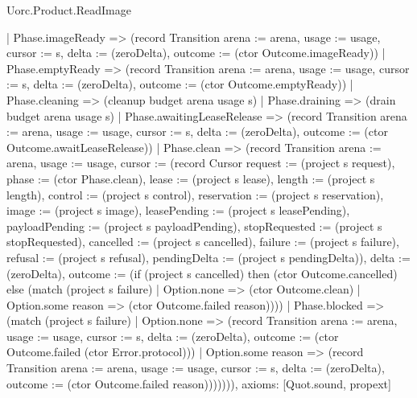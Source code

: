 \begin{lexlean}{Uorc.Product.ReadImage}
\begin{semanticmodule}
{        | Phase.imageReady => (record Transition {arena := arena, usage := usage, cursor := s, delta := (zeroDelta), outcome := (ctor Outcome.imageReady)})
        | Phase.emptyReady => (record Transition {arena := arena, usage := usage, cursor := s, delta := (zeroDelta), outcome := (ctor Outcome.emptyReady)})
        | Phase.cleaning => (cleanup budget arena usage s)
        | Phase.draining => (drain budget arena usage s)
        | Phase.awaitingLeaseRelease => (record Transition {arena := arena, usage := usage, cursor := s, delta := (zeroDelta), outcome := (ctor Outcome.awaitLeaseRelease)})
        | Phase.clean => (record Transition {arena := arena, usage := usage, cursor := (record Cursor {request := (project s request), phase := (ctor Phase.clean), lease := (project s lease), length := (project s length), control := (project s control), reservation := (project s reservation), image := (project s image), leasePending := (project s leasePending), payloadPending := (project s payloadPending), stopRequested := (project s stopRequested), cancelled := (project s cancelled), failure := (project s failure), refusal := (project s refusal), pendingDelta := (project s pendingDelta)}), delta := (zeroDelta), outcome := (if (project s cancelled) then (ctor Outcome.cancelled) else (match (project s failure)
          | Option.none => (ctor Outcome.clean)
          | Option.some reason => (ctor Outcome.failed reason)))})
        | Phase.blocked => (match (project s failure)
          | Option.none => (record Transition {arena := arena, usage := usage, cursor := s, delta := (zeroDelta), outcome := (ctor Outcome.failed (ctor Error.protocol))})
          | Option.some reason => (record Transition {arena := arena, usage := usage, cursor := s, delta := (zeroDelta), outcome := (ctor Outcome.failed reason)})))))),
  axioms: [Quot.sound, propext]
}


\end{semanticmodule}
\end{lexlean}

